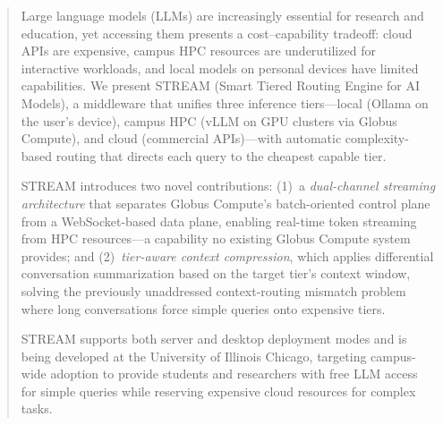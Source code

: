 \documentclass[manuscript, review]{acmart}
\begin{document}
\begin{abstract}
Large language models (LLMs) are increasingly essential for research and education, yet accessing them presents a cost--capability tradeoff: cloud APIs are expensive, campus HPC resources are underutilized for interactive workloads, and local models on personal devices have limited capabilities. We present STREAM (Smart Tiered Routing Engine for AI Models), a middleware that unifies three inference tiers---local (Ollama on the user's device), campus HPC (vLLM on GPU clusters via Globus Compute), and cloud (commercial APIs)---with automatic complexity-based routing that directs each query to the cheapest capable tier.

STREAM introduces two novel contributions: (1)~a \textit{dual-channel streaming architecture} that separates Globus Compute's batch-oriented control plane from a WebSocket-based data plane, enabling real-time token streaming from HPC resources---a capability no existing Globus Compute system provides; and (2)~\textit{tier-aware context compression}, which applies differential conversation summarization based on the target tier's context window, solving the previously unaddressed context-routing mismatch problem where long conversations force simple queries onto expensive tiers.

STREAM supports both server and desktop deployment modes and is being developed at the University of Illinois Chicago, targeting campus-wide adoption to provide students and researchers with free LLM access for simple queries while reserving expensive cloud resources for complex tasks.

\end{abstract}


\maketitle

\end{document}
